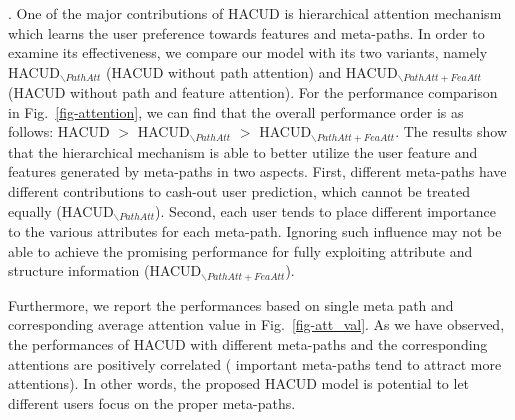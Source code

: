 . One of the major contributions of HACUD is hierarchical attention mechanism which learns the user preference towards features and meta-paths.
In order to examine its effectiveness, we compare our model with its two variants, namely HACUD$_{ \backslash PathAtt}$ (HACUD without path attention) and HACUD$_{\backslash PathAtt + FeaAtt}$ (HACUD without path and feature attention). 
For the performance comparison in Fig.~\ref{fig-attention}, 
we can find that the overall performance order is as follows: HACUD $>$ HACUD$_{ \backslash PathAtt}$ $>$ HACUD$_{\backslash PathAtt + FeaAtt}$. The results show that the hierarchical mechanism is able to better utilize the user feature and features generated by meta-paths  in two aspects. First,  different meta-paths have different contributions to cash-out user prediction, which cannot be treated equally (\ie HACUD$_{ \backslash PathAtt}$). Second, each user tends to place different importance to the various attributes for each meta-path. Ignoring such influence may not be able to achieve the promising performance for fully exploiting attribute and structure information (\ie HACUD$_{\backslash PathAtt + FeaAtt}$).

Furthermore, we report the performances based on single meta path and corresponding average attention value in Fig.~\ref{fig-att_val}.  As we have observed, the performances of HACUD with different meta-paths and the corresponding attentions are positively correlated ( \ie important meta-paths tend to attract more attentions). In other words, the proposed HACUD model is potential to let different users focus on the proper meta-paths. %

